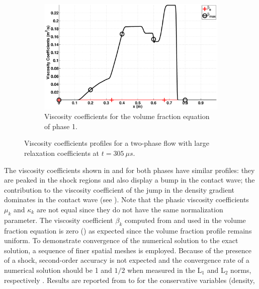 \documentclass[preprint,10pt]{elsarticle}
\begin{document}
\begin{figure}[H]
        \begin{subfigure}[b]{0.495\textwidth}
                \centering
                \includegraphics[width=\textwidth]{figures/two_phases_liquid_beta.eps}
                \caption{Viscosity coefficients for the volume fraction equation of phase 1.}
                \label{fig:indp-phase-beta}
        \end{subfigure}        
        \caption{Viscosity coefficients profiles for a two-phase flow with large relaxation coefficients at $t=305 \ \mu s$.}\label{fig:indp-phase-visc-coeff}
\end{figure}
%
The viscosity coefficients shown in  and  for both phases have similar profiles: they are peaked in the 
shock regions and also display a bump in the contact wave; the contribution to the viscosity coefficient of the jump in the density gradient dominates 
in the contact wave (see ). Note 
that the phasic viscosity coefficients $\mu_k$ and $\kappa_k$ are not equal since they do not have the same normalization parameter. The viscosity 
coefficient $\beta_k$ computed from  and used in the volume fraction equation is zero () as expected 
since the volume fraction profile remains uniform. 
To demonstrate convergence of the numerical solution to the exact solution, a sequence of finer spatial meshes is employed. Because 
of the presence of a shock, second-order accuracy is not expected and the convergence rate of a numerical solution 
should be 1 and $1/2$ when measured in the L$_1$ and L$_2$ norms, respectively \cite{banks-jeffrey, majda-andrew}. 
Results are reported from  to  for the conservative variables (density, 
\end{document}

